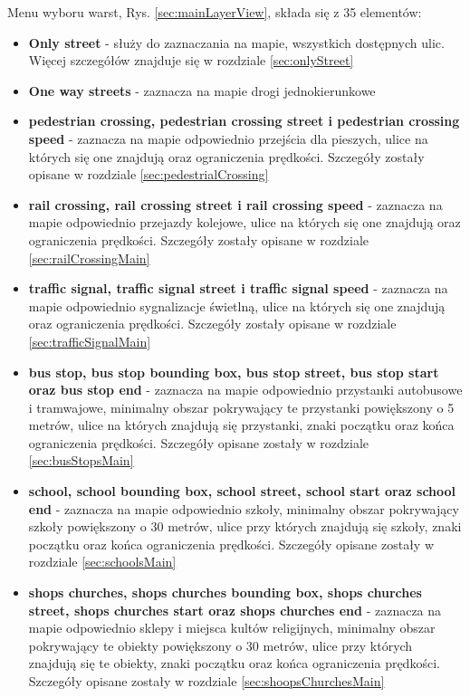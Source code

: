 Menu wyboru warst, Rys. \ref{sec:mainLayerView}, składa się z 35 elementów:
\begin{itemize}
\item \textbf{Only street} - służy do zaznaczania na mapie, wszystkich dostępnych ulic. Więcej szczegółów znajduje się w rozdziale \ref{sec:onlyStreet}
\item \textbf{One way streets} - zaznacza na mapie drogi jednokierunkowe
\item \textbf{pedestrian crossing, pedestrian crossing street i pedestrian crossing speed} - zaznacza na mapie odpowiednio przejścia dla pieszych, ulice na których się one znajdują oraz ograniczenia prędkości. Szczegóły zostały opisane w rozdziale \ref{sec:pedestrialCrossing} 
\item \textbf{rail crossing, rail crossing street i rail crossing speed} - zaznacza na mapie odpowiednio przejazdy kolejowe, ulice na których się one znajdują oraz ograniczenia prędkości. Szczegóły zostały opisane w rozdziale \ref{sec:railCrossingMain} 
\item \textbf{traffic signal, traffic signal street i traffic signal speed} - zaznacza na mapie odpowiednio sygnalizacje świetlną, ulice na których się one znajdują oraz ograniczenia prędkości. Szczegóły zostały opisane w rozdziale \ref{sec:trafficSignalMain} 
\item \textbf{bus stop, bus stop bounding box, bus stop street, bus stop start oraz bus stop end} - zaznacza na mapie odpowiednio przystanki autobusowe i tramwajowe, minimalny obszar pokrywający te przystanki powiększony o 5 metrów, ulice na których znajdują się przystanki, znaki początku oraz końca ograniczenia prędkości. Szczegóły opisane zostały w rozdziale \ref{sec:busStopsMain}
\item \textbf{school, school bounding box, school street, school start oraz school end} - zaznacza na mapie odpowiednio szkoły, minimalny obszar pokrywający szkoły powiększony o 30 metrów, ulice przy których znajdują się szkoły, znaki początku oraz końca ograniczenia prędkości. Szczegóły opisane zostały w rozdziale \ref{sec:schoolsMain}
\item \textbf{shops churches, shops churches bounding box, shops churches street, shops churches start oraz shops churches end} - zaznacza na mapie odpowiednio sklepy i miejsca kultów religijnych, minimalny obszar pokrywający te obiekty powiększony o 30 metrów, ulice przy których znajdują się te obiekty, znaki początku oraz końca ograniczenia prędkości. Szczegóły opisane zostały w rozdziale \ref{sec:shoopsChurchesMain}

\end{itemize}
